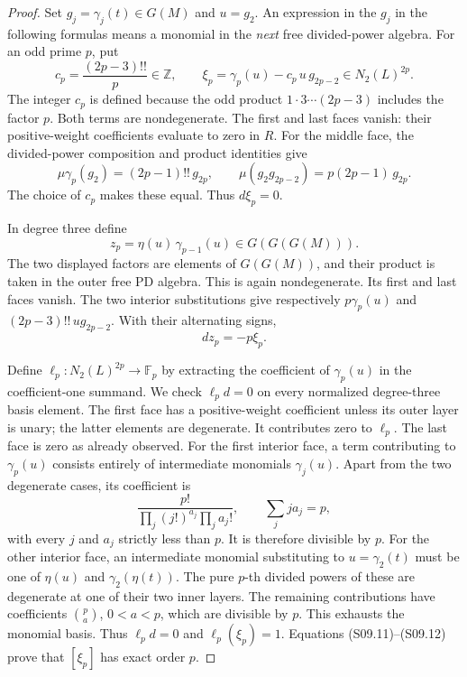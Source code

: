 \begin{proof}
Set $g_j=\gamma_j(t)\in G(M)$ and $u=g_2$.  An expression in
the $g_j$ in the following formulas means a monomial in the
\emph{next} free divided-power algebra.  For an odd prime $p$,
put
\[
 c_p=\frac{(2p-3)!!}{p}\in\mathbb Z,
 \qquad
 \xi_p=\gamma_p(u)-c_p\,u\,g_{2p-2}\in N_2(L)^{2p}.
 \tag{S09.11}
\]
The integer $c_p$ is defined because the odd product
$1\cdot3\cdots(2p-3)$ includes the factor $p$.
Both terms are nondegenerate.  The first and last faces vanish:
their positive-weight coefficients evaluate to zero in $R$.
For the middle face, the divided-power composition and product
identities give
\[
 \mu\gamma_p(g_2)=(2p-1)!!\,g_{2p},
 \qquad
 \mu(g_2g_{2p-2})=p(2p-1)\,g_{2p}.
\]
The choice of $c_p$ makes these equal.  Thus $d\xi_p=0$.

In degree three define
\[
 z_p=\eta(u)\,\gamma_{p-1}(u)\in G(G(G(M))).
\]
The two displayed factors are elements of $G(G(M))$, and
their product is taken in the outer free PD algebra.
This is again nondegenerate.  Its first and last faces vanish.
The two interior substitutions give respectively
$p\gamma_p(u)$ and $(2p-3)!!\,u g_{2p-2}$.  With their
alternating signs,
\[
                       dz_p=-p\xi_p.                 \tag{S09.12}
\]

Define $\ell_p:N_2(L)^{2p}\to\mathbb F_p$ by extracting
the coefficient of $\gamma_p(u)$ in the coefficient-one
summand.  We check $\ell_p d=0$ on every normalized degree-three
basis element.  The first face has a positive-weight coefficient
unless its outer layer is unary; the latter elements are
degenerate.  It contributes zero to $\ell_p$.  The last face
is zero as already observed.  For the first interior face, a
term contributing to $\gamma_p(u)$ consists entirely of
intermediate monomials $\gamma_j(u)$.  Apart from the two
degenerate cases, its coefficient is
\[
 \frac{p!}{\prod_j (j!)^{a_j}\prod_j a_j!},
 \qquad \sum_j j a_j=p,
\]
with every $j$ and $a_j$ strictly less than $p$.  It is therefore
divisible by $p$.  For the other interior face, an intermediate
monomial substituting to $u=\gamma_2(t)$ must be one of
$\eta(u)$ and $\gamma_2(\eta(t))$.  The pure $p$-th divided
powers of these are degenerate at one of their two inner layers.
The remaining contributions have coefficients
$\binom pa$, $0<a<p$, which are divisible by $p$.
This exhausts the monomial basis.  Thus $\ell_p d=0$ and
$\ell_p(\xi_p)=1$.  Equations (S09.11)--(S09.12) prove that
$[\xi_p]$ has exact order $p$.


\end{proof}
